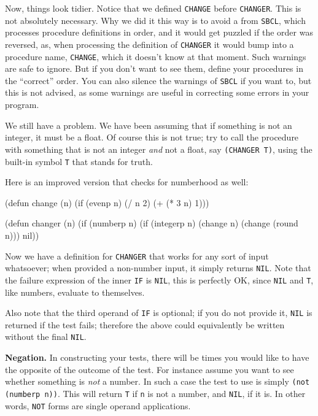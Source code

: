 \documentclass[a4paper,11pt]{article}
\begin{document}
\begin{uenum}
\begin{uenumi}
Now, things look tidier. Notice that we defined \Verb+CHANGE+ before \Verb+CHANGER+. This is not absolutely necessary. Why we did it this way is to avoid a  from \Verb+SBCL+, which processes procedure definitions in order, and it would get puzzled if the order was reversed, as, when processing the definition of \Verb+CHANGER+ it would bump into a procedure name, \Verb+CHANGE+, which it doesn't know at that moment. Such warnings are safe to ignore. But if you don't want to see them, define your procedures in the ``correct'' order. You can also silence the warnings of \Verb+SBCL+ if you want to, but this is not advised, as some warnings are useful in correcting some errors in your program.


\item We still have a problem. We have been assuming that if something is not an integer, it must be a float. Of course this is not true; try to call the procedure with something that is not an integer \emph{and} not a float, say \Verb+(CHANGER T)+, using the built-in symbol \Verb+T+ that stands for truth.

\item Here is an improved version that checks for numberhood as well:

\begin{lispcode}
(defun change (n)
  (if (evenp n)
    (/ n 2)
    (+ (* 3 n) 1)))

(defun changer (n)
  (if (numberp n)
    (if (integerp n)
      (change n)
      (change (round n)))
    nil))
\end{lispcode}

Now we have a definition for \Verb+CHANGER+ that works for any sort of input whatsoever; when provided a non-number input, it simply returns \Verb+NIL+.  Note that the failure expression of the inner \Verb+IF+ is \Verb+NIL+, this is perfectly OK, since \Verb+NIL+ and \Verb+T+, like numbers, evaluate to themselves.

\item Also note that the third operand of \Verb+IF+ is optional; if you do not provide it, \Verb+NIL+ is returned if the test fails; therefore the above could equivalently be written without the final \Verb+NIL+.
\end{uenumi}

\item {\bf Negation.} In constructing your tests, there will be times you would like to have the opposite of the outcome of the test. For instance assume you want to see whether something is \emph{not} a number. In such a case the test to use is simply \Verb+(not (numberp n))+. This will return \Verb+T+ if \Verb+n+ is not a number, and \Verb+NIL+, if it is. In other words, \Verb+NOT+ forms are single operand applications.


\end{uenum}
\end{document}
